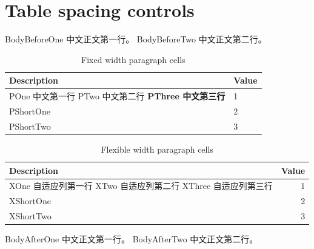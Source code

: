 \documentclass{uestcthesis}
\begin{document}
\uestcmainmatter
\chapter{Table spacing controls}

BodyBeforeOne 中文正文第一行。\newline
BodyBeforeTwo 中文正文第二行。
\begin{table}[H]
\centering
\caption{Fixed width paragraph cells}
\begin{tabular}{p{6cm}p{5cm}}
\toprule
Description & Value\\\midrule
POne 中文第一行\newline
PTwo 中文第二行\newline
\textbf{PThree 中文第三行} & 1\\
PShortOne & 2\\
PShortTwo & 3\\
\bottomrule
\end{tabular}
\end{table}
\begin{table}[H]
\centering
\caption{Flexible width paragraph cells}
\begin{tabularx}{11cm}{Xr}
\toprule
Description & Value\\\midrule
XOne 自适应列第一行\newline
XTwo 自适应列第二行\newline
XThree 自适应列第三行 & 1\\
XShortOne & 2\\
XShortTwo & 3\\
\bottomrule
\end{tabularx}
\end{table}

BodyAfterOne 中文正文第一行。\newline
BodyAfterTwo 中文正文第二行。
\clearpage
\end{document}
